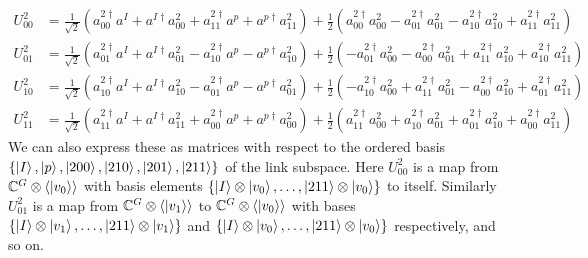 \documentclass[10pt,reqno]{amsart}
\numberwithin{equation}{section}
\begin{document}
	\begin{align}
		U^2_{00} &= \frac{1}{\sqrt{2}} (a^{2\dagger}_{00}a^I+a^{I\dagger}a^2_{00}+a^{2\dagger}_{11}a^p+a^{p\dagger}a^2_{11} ) +\frac{1}{2} (a^{2\dagger}_{00}a^2_{00}-a^{2\dagger}_{01}a^2_{01}-a^{2\dagger}_{10}a^2_{10}+a^{2\dagger}_{11}a^2_{11}) \nonumber\\
		U^2_{01} &= \frac{1}{\sqrt{2}} (a^{2\dagger}_{01}a^I+a^{I\dagger}a^2_{01}-a^{2\dagger}_{10}a^p-a^{p\dagger}a^2_{10} ) +\frac{1}{2} (-a^{2\dagger}_{01}a^2_{00}-a^{2\dagger}_{00}a^2_{01}+a^{2\dagger}_{11}a^2_{10}+a^{2\dagger}_{10}a^2_{11}) \nonumber\\
		U^2_{10} &= \frac{1}{\sqrt{2}} (a^{2\dagger}_{10}a^I+a^{I\dagger}a^2_{10}-a^{2\dagger}_{01}a^p-a^{p\dagger}a^2_{01} ) +\frac{1}{2} (-a^{2\dagger}_{10}a^2_{00}+a^{2\dagger}_{11}a^2_{01}-a^{2\dagger}_{00}a^2_{10}+a^{2\dagger}_{01}a^2_{11}) \nonumber\\
		U^2_{11} &= \frac{1}{\sqrt{2}} (a^{2\dagger}_{11}a^I+a^{I\dagger}a^2_{11}+a^{2\dagger}_{00}a^p+a^{p\dagger}a^2_{00} ) +\frac{1}{2} (a^{2\dagger}_{11}a^2_{00}+a^{2\dagger}_{10}a^2_{01}+a^{2\dagger}_{01}a^2_{10}+a^{2\dagger}_{00}a^2_{11}) 
	\end{align}
	We can also express these as matrices with respect to the ordered basis $\{ \ket{I},\ket{p},\ket{200},\ket{210},\ket{201},\ket{211} \}$ of the link subspace.
	Here $U^2_{00}$ is a map from $\mathbb{C}^G \otimes \langle \ket{v_0} \rangle$ with basis elements $\{\ket{I}\otimes \ket{v_0},\ldots,\ket{211}\otimes \ket{v_0} \}$ to itself.
	Similarly $U^2_{01}$ is a map from $\mathbb{C}^G \otimes \langle \ket{v_1} \rangle$ to $\mathbb{C}^G \otimes \langle \ket{v_0} \rangle$ with bases $\{\ket{I}\otimes \ket{v_1},\ldots,\ket{211}\otimes \ket{v_1} \}$ and $\{\ket{I}\otimes \ket{v_0},\ldots,\ket{211}\otimes \ket{v_0} \}$ respectively, and so on.
\end{document}
